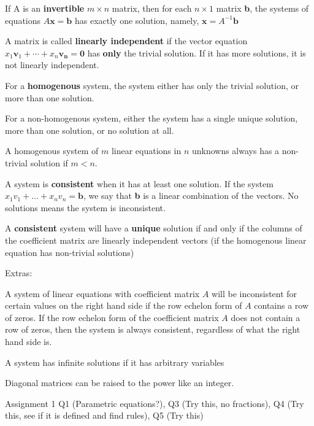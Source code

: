 \documentclass[11pt, letterpaper, twoside]{article}
\begin{document}
\vspace{2mm}
If A is an \textbf{invertible} \(m\times n\) matrix, then for each \(n\times1\) matrix \textbf{b}, the systems of equations \(A\textbf{x}=\textbf{b}\) has exactly one solution, namely, \(\textbf{x}=A^{-1}\textbf{b}\)

\vspace{2mm}
A matrix is called \textbf{linearly independent} if the vector equation \(x_1\mathbf{v}_1+\cdots+x_n\mathbf{v_n}=\mathbf{0}\) has \textbf{only} the trivial solution. If it has more solutions, it is not linearly independent.

\vspace{2mm}
For a \textbf{homogenous} system, the system either has only the trivial solution, or more than one solution.

For a non-homogenous system, either the system has a single unique solution, more than one solution, or no solution at all.

A homogenous system of \(m\) linear equations in \(n\) unknowns always has a non-trivial solution if \(m<n\).

A system is \textbf{consistent} when it has at least one solution. If the system \(x_1v_1+\dots + x_nv_n=\mathbf{b}\), we say that \textbf{b} is a linear combination of the vectors. No solutions means the system is inconsistent.

A \textbf{consistent} system will have a \textbf{unique} solution if and only if the columns of the coefficient matrix are linearly independent vectors (if the homogenous linear equation has non-trivial solutions)

\pagebreak

Extras:

\vspace{2mm}
A system of linear equations with coefficient matrix \(A\) will be inconsistent for certain values on the right hand side if the row echelon form of \(A\) contains a row of zeros. If the row echelon form of the coefficient matrix \(A\) does not contain a row of zeros, then the system is always consistent, regardless of what the right hand side is.

\vspace{2mm}
A system has infinite solutions if it has arbitrary variables

\vspace{2mm}
Diagonal matrices can be raised to the power like an integer.

\vspace{2mm}
Assignment 1 Q1 (Parametric equations?), Q3 (Try this, no fractions), Q4 (Try this, see if it is defined and find rules), Q5 (Try this)
\end{document}
